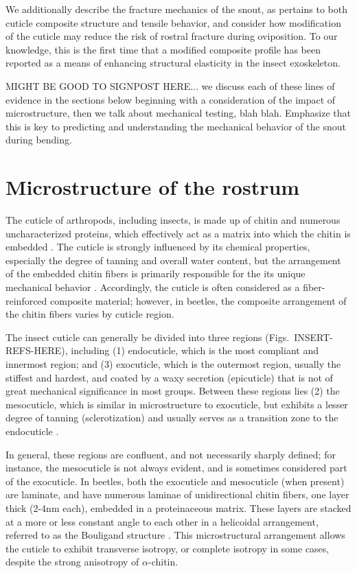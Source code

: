 \documentclass[twocolumn, linenumbers, superscriptaddress]{revtex4-1}
\begin{document}
	We additionally describe the fracture mechanics of the snout, as pertains to both cuticle composite structure and tensile behavior, and consider how modification of the cuticle may reduce the risk of rostral fracture during oviposition.
	To our knowledge, this is the first time that a modified composite profile has been reported as a means of enhancing structural elasticity in the insect exoskeleton.


	MIGHT BE GOOD TO SIGNPOST HERE... we discuss each of these lines of evidence in the sections below beginning with a consideration of the impact of microstructure, then we talk about mechanical testing, blah blah. Emphasize that this is key to predicting and understanding the mechanical behavior of the snout during bending.
	\section{Microstructure of the rostrum}\label{sec:microstructure}
		The cuticle of arthropods, including insects, is made up of chitin and numerous uncharacterized proteins, which effectively act as a matrix into which the chitin is embedded \cite{Nikolov2011,Nikolov2010,Vincent2004}.
		The cuticle is strongly influenced by its chemical properties, especially the degree of tanning and overall water content, but the arrangement of the embedded chitin fibers is primarily responsible for the its unique mechanical behavior \cite{Klocke2011,Vincent2004}.	
		Accordingly, the cuticle is often considered as a fiber-reinforced composite material; however, in beetles, the composite arrangement of the chitin fibers varies by cuticle region.	
	
		The insect cuticle can generally be divided into three regions (Figs.~INSERT-REFS-HERE), including (1) endocuticle, which is the most compliant and innermost region; and (3) exocuticle, which is the outermost region, usually the stiffest and hardest, and coated by a waxy secretion (epicuticle) that is not of great mechanical significance in most groups.
		Between these regions lies (2) the mesocuticle, which is similar in microstructure to exocuticle, but exhibits a lesser degree of tanning (sclerotization) and usually serves as a transition zone to the endocuticle \cite{Klocke2011,Vincent1982,Vincent2004}.
		
		In general, these regions are confluent, and not necessarily sharply defined; for instance, the mesocuticle is not always evident, and is sometimes considered part of the exocuticle.
		In beetles, both the exocuticle and mesocuticle (when present) are laminate, and have numerous laminae of unidirectional chitin fibers, one layer thick (2-4nm each), embedded in a proteinaceous matrix.
		These layers are stacked at a more or less constant angle to each other in a helicoidal arrangement, referred to as the Bouligand structure \cite{Blackwell1980,Bouligand1972,Neville1976}. 
		This microstructural arrangement allows the cuticle to exhibit transverse isotropy, or complete isotropy in some cases, despite the strong anisotropy of $\alpha$-chitin.
		
\end{document}
